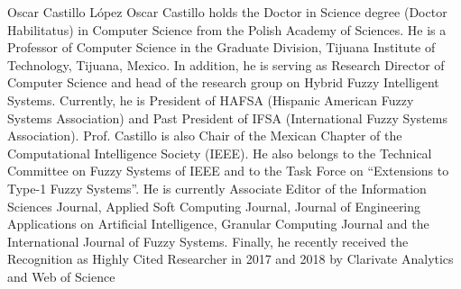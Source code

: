 \documentclass{ieeeaccess}
\begin{document}
\begin{IEEEbiography}{Oscar
    Castillo L\'{o}pez} Oscar Castillo holds the Doctor in Science degree (Doctor
  Habilitatus) in Computer Science from the Polish Academy of Sciences.
  He is a Professor of Computer Science in the Graduate Division, Tijuana
  Institute of Technology, Tijuana, Mexico. In addition, he is serving as Research
  Director of Computer Science and head of the research group on Hybrid Fuzzy
  Intelligent Systems. Currently, he is President of HAFSA (Hispanic American
  Fuzzy Systems Association) and Past President of IFSA (International Fuzzy
  Systems Association). Prof. Castillo is also Chair of the Mexican Chapter of the
  Computational Intelligence Society (IEEE). He also belongs to the Technical
  Committee on Fuzzy Systems of IEEE and to the Task Force on ``Extensions to
  Type-1 Fuzzy Systems''. He is currently Associate Editor of the Information
  Sciences Journal, Applied Soft Computing Journal, Journal of Engineering
  Applications on Artificial Intelligence, Granular Computing Journal and the
  International Journal of Fuzzy Systems. Finally, he recently received the Recognition as
  Highly Cited Researcher in 2017 and 2018 by Clarivate Analytics and Web of
  Science \end{IEEEbiography}




\EOD
\end{document}
